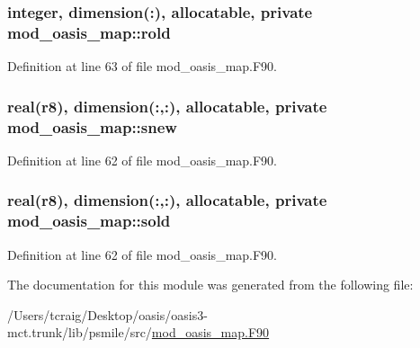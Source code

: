 \hypertarget{classmod__oasis__map_a2931a6f582d0173cc0e6b155b8cb55b7}{
\subsubsection[{rold}]{\setlength{\rightskip}{0pt plus 5cm}integer, dimension(\+:), allocatable, private mod\+\_\+oasis\+\_\+map\+::rold\hspace{0.3cm}{\ttfamily [private]}}}\label{classmod__oasis__map_a2931a6f582d0173cc0e6b155b8cb55b7}


Definition at line 63 of file mod\+\_\+oasis\+\_\+map.\+F90.

\hypertarget{classmod__oasis__map_a28b59479c467c58995c6300071ca140a}{
\subsubsection[{snew}]{\setlength{\rightskip}{0pt plus 5cm}real({\bf r8}), dimension(\+:,\+:), allocatable, private mod\+\_\+oasis\+\_\+map\+::snew\hspace{0.3cm}{\ttfamily [private]}}}\label{classmod__oasis__map_a28b59479c467c58995c6300071ca140a}


Definition at line 62 of file mod\+\_\+oasis\+\_\+map.\+F90.

\hypertarget{classmod__oasis__map_a1fc7e7f295910352524d442c5d0dbf79}{
\subsubsection[{sold}]{\setlength{\rightskip}{0pt plus 5cm}real({\bf r8}), dimension(\+:,\+:), allocatable, private mod\+\_\+oasis\+\_\+map\+::sold\hspace{0.3cm}{\ttfamily [private]}}}\label{classmod__oasis__map_a1fc7e7f295910352524d442c5d0dbf79}


Definition at line 62 of file mod\+\_\+oasis\+\_\+map.\+F90.



The documentation for this module was generated from the following file\+:\begin{DoxyCompactItemize}
\item 
/\+Users/tcraig/\+Desktop/oasis/oasis3-\/mct.\+trunk/lib/psmile/src/\hyperlink{mod__oasis__map_8_f90}{mod\+\_\+oasis\+\_\+map.\+F90}\end{DoxyCompactItemize}

